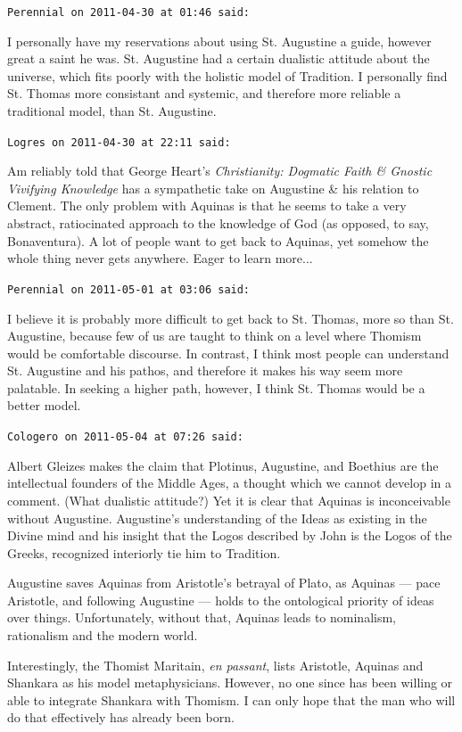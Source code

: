 \begin{footnotesize}
\begin{sffamily}
\texttt{Perennial on 2011-04-30 at 01:46 said:}

I personally have my reservations about using St. Augustine a guide, however great a saint he was. St. Augustine had a certain dualistic attitude about the universe, which fits poorly with the holistic model of Tradition. I personally find St. Thomas more consistant and systemic, and therefore more reliable a traditional model, than St. Augustine.

\hfill

\texttt{Logres on 2011-04-30 at 22:11 said:}

Am reliably told that George Heart's \textit{Christianity: Dogmatic Faith \& Gnostic Vivifying Knowledge} has a sympathetic take on Augustine \& his relation to Clement. The only problem with Aquinas is that he seems to take a very abstract, ratiocinated approach to the knowledge of God (as opposed, to say, Bonaventura). A lot of people want to get back to Aquinas, yet somehow the whole thing never gets anywhere. Eager to learn more... 

\hfill

\texttt{Perennial on 2011-05-01 at 03:06 said:}

I believe it is probably more difficult to get back to St. Thomas, more so than St. Augustine, because few of us are taught to think on a level where Thomism would be comfortable discourse. In contrast, I think most people can understand St. Augustine and his pathos, and therefore it makes his way seem more palatable. In seeking a higher path, however, I think St. Thomas would be a better model.

\hfill

\texttt{Cologero on 2011-05-04 at 07:26 said:}

Albert Gleizes makes the claim that Plotinus, Augustine, and Boethius are the intellectual founders of the Middle Ages, a thought which we cannot develop in a comment. (What dualistic attitude?) Yet it is clear that Aquinas is inconceivable without Augustine. Augustine's understanding of the Ideas as existing in the Divine mind and his insight that the Logos described by John is the Logos of the Greeks, recognized interiorly tie him to Tradition.

Augustine saves Aquinas from Aristotle's betrayal of Plato, as Aquinas --- pace Aristotle, and following Augustine --- holds to the ontological priority of ideas over things. Unfortunately, without that, Aquinas leads to nominalism, rationalism and the modern world.

Interestingly, the Thomist Maritain, \emph{en passant}, lists Aristotle, Aquinas and Shankara as his model metaphysicians. However, no one since has been willing or able to integrate Shankara with Thomism. I can only hope that the man who will do that effectively has already been born.

\hfill

\end{sffamily}
\end{footnotesize}

